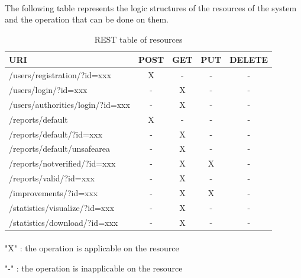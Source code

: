 					\paragraph{}
						The following table represents the logic structures of the resources of the system and the operation that can be done on them.
						\begin{table}[!h]
							\centering
							\begin{tabular}{lcccc}
								\toprule
								\textbf{URI}	& \textbf{POST} & \textbf{GET} & \textbf{PUT} & \textbf{DELETE} \\
								\midrule
								/users/registration/?id=xxx & X & - & - & - \\
								/users/login/?id=xxx & - & X & - & - \\
								/users/authorities/login/?id=xxx & - & X & - & - \\
								/reports/default & X & - & - & - \\
								/reports/default/?id=xxx & - & X & - & - \\
								/reports/default/unsafearea & - & X & - & - \\
								/reports/notverified/?id=xxx & - & X & X & - \\
								/reports/valid/?id=xxx & - & X & - & - \\
								/improvements/?id=xxx & - & X & X & - \\
								/statistics/visualize/?id=xxx & - & X & - & - \\
								/statistics/download/?id=xxx & - & X & - & - \\
							\end{tabular}
							\caption{REST table of resources}
						\end{table}
					\paragraph{}
						"X" : the operation is applicable on the resource
						
						"-" : the operation is inapplicable on the resource
					\clearpage
